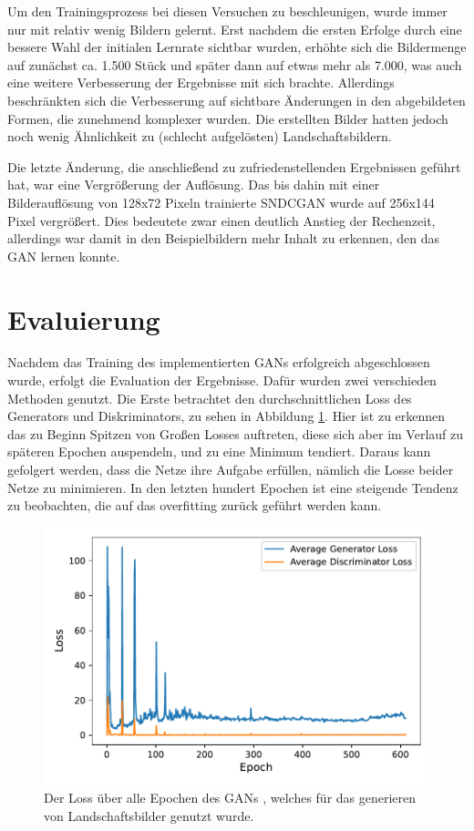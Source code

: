 Um den Trainingsprozess bei diesen Versuchen zu beschleunigen, wurde immer nur mit relativ wenig Bildern gelernt. Erst nachdem die ersten Erfolge durch eine bessere Wahl der initialen Lernrate sichtbar wurden, erhöhte sich die Bildermenge auf zunächst ca. 1.500 Stück und später dann auf etwas mehr als 7.000, was auch eine weitere Verbesserung der Ergebnisse mit sich brachte. Allerdings beschränkten sich die Verbesserung auf sichtbare Änderungen in den abgebildeten Formen, die zunehmend komplexer wurden. Die erstellten Bilder hatten jedoch noch wenig Ähnlichkeit zu (schlecht aufgelösten) Landschaftsbildern.
 
 Die letzte Änderung, die anschließend zu zufriedenstellenden Ergebnissen geführt hat, war eine Vergrößerung der Auflösung. Das bis dahin mit einer Bilderauflösung von 128x72 Pixeln trainierte SNDCGAN wurde auf 256x144 Pixel vergrößert. Dies bedeutete zwar einen deutlich Anstieg der Rechenzeit, allerdings war damit in den Beispielbildern mehr Inhalt zu erkennen, den das GAN lernen konnte.
 
 \section{Evaluierung}\label{evalGen} 
  Nachdem das Training des implementierten GANs erfolgreich abgeschlossen wurde, erfolgt die Evaluation der Ergebnisse. Dafür wurden zwei verschieden Methoden genutzt. Die Erste betrachtet den durchschnittlichen Loss des Generators und Diskriminators, zu sehen in Abbildung \ref{fig:plot_losses_gen}.  Hier ist zu erkennen das zu Beginn Spitzen von Großen Losses auftreten, diese sich aber im Verlauf zu späteren Epochen auspendeln, und zu eine Minimum tendiert.
 Daraus kann gefolgert werden, dass die Netze ihre Aufgabe erfüllen, nämlich die Losse beider Netze zu minimieren.
 In den letzten hundert Epochen ist eine steigende Tendenz zu beobachten, die auf das overfitting zurück geführt werden kann.
 
 
 
 
 \begin{figure}[t]
 	\centering
 	\includegraphics[width=0.7\linewidth]{images/plot_line_plot_losses_gen}
 	\caption[Losses des generirenden GANs]{Der Loss über alle Epochen des GANs , welches für das generieren von Landschaftsbilder genutzt wurde.}
 	\label{fig:plot_losses_gen}
 \end{figure}
 

